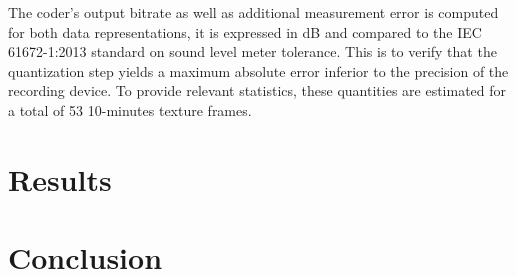 \documentclass[preprint,12pt]{elsarticle}
\begin{document}
The coder's output bitrate as well as additional measurement error is computed for both data representations, it is expressed in dB and compared to the IEC 61672-1:2013 standard on sound level meter tolerance. This is to verify that the quantization step yields a maximum absolute error inferior to the precision of the recording device. To provide relevant statistics, these quantities are estimated for a total of 53 10-minutes texture frames.\\

\section{Results}

\section{Conclusion}

\clearpage



\end{document}
